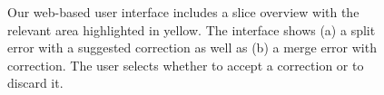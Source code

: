 \begin{figure}[hb]
 \centering
    \hfill
	\caption{Our web-based user interface includes a slice overview with the relevant area highlighted in yellow. The interface shows (a) a split error with a suggested correction as well as (b) a merge error with correction. The user selects whether to accept a correction or to discard it.}
\label{fig:prototype}
\end{figure}
